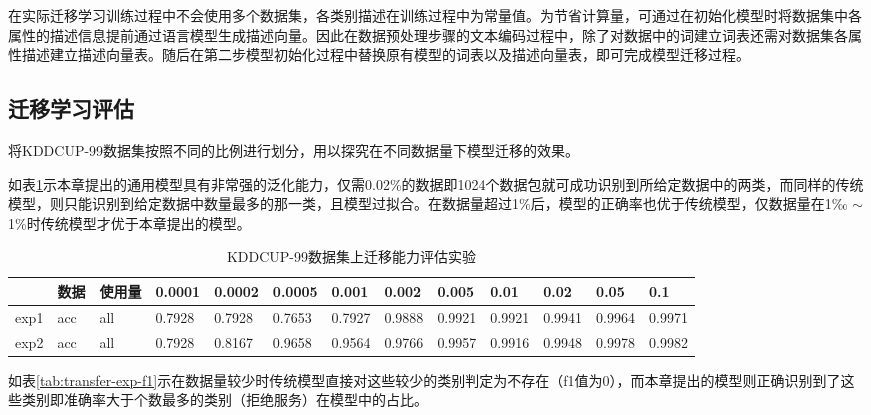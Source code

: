 在实际迁移学习训练过程中不会使用多个数据集，各类别描述在训练过程中为常量值。为节省计算量，可通过在初始化模型时将数据集中各属性的描述信息提前通过语言模型生成描述向量。因此在数据预处理步骤的文本编码过程中，除了对数据中的词建立词表还需对数据集各属性描述建立描述向量表。随后在第二步模型初始化过程中替换原有模型的词表以及描述向量表，即可完成模型迁移过程。

\subsection{迁移学习评估}
将KDDCUP-99数据集按照不同的比例进行划分，用以探究在不同数据量下模型迁移的效果。

如表\ref{tab:transfer-exp-acc}示本章提出的通用模型具有非常强的泛化能力，仅需0.02\%的数据即1024个数据包就可成功识别到所给定数据中的两类，而同样的传统模型，则只能识别到给定数据中数量最多的那一类，且模型过拟合。在数据量超过1\%后，模型的正确率也优于传统模型，仅数据量在1‰ $\sim$ 1\%时传统模型才优于本章提出的模型。
\begin{table}[htbp]
\caption{KDDCUP-99数据集上迁移能力评估实验}
    \centering
    \begin{adjustbox}{max width=\textwidth}
    \begin{tabular}{lllllllllllll}
    \toprule
        ~ & 数据& 使用量& 0.0001 &  0.0002&0.0005& 0.001& 0.002 & 0.005 & 0.01 & 0.02 & 0.05 & 0.1 \\ \midrule
        exp1 & acc & all & 0.7928 &  0.7928 &0.7653 & 0.7927 & 0.9888 & 0.9921 & 0.9921 & 0.9941 & 0.9964 & 0.9971 
\\ 
        exp2 & acc & all & 0.7928 &  0.8167 &0.9658 & 0.9564 & 0.9766 & 0.9957 & 0.9916 & 0.9948 & 0.9978 & 0.9982 \\
    \bottomrule
    \end{tabular}
    \end{adjustbox}
    \label{tab:transfer-exp-acc}
\end{table}

如表\ref{tab:transfer-exp-f1}示在数据量较少时传统模型直接对这些较少的类别判定为不存在（f1值为0），而本章提出的模型则正确识别到了这些类别即准确率大于个数最多的类别（拒绝服务）在模型中的占比。

